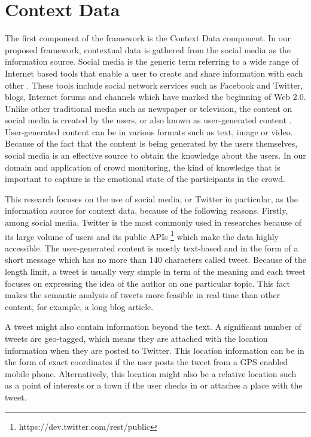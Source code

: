 \section{Context Data}
The first component of the framework is the Context Data component. In our proposed framework, contextual data is gathered from the social media as the information source. Social media is the generic term referring to a wide range of Internet based tools that enable a user to create and share information with each other \citep{kaplan2010users}. These tools include social network services such as Facebook and Twitter, blogs, Internet forums and channels which have marked the beginning of Web 2.0. Unlike other traditional media such as newspaper or television, the content on social media is created by the users, or also known as user-generated content \citep{kaplan2010users}. User-generated content can be in various formats such as text, image or video. Because of the fact that the content is being generated by the users themselves, social media is an effective source to obtain the knowledge about the users. In our domain and application of crowd monitoring, the kind of knowledge that is important to capture is the emotional state of the participants in the crowd. 

This research focuses on the use of social media, or Twitter in particular, as the information source for context data, because of the following reasons. Firstly, among social media, Twitter is the most commonly used in researches because of its large volume of users and its public APIs \footnote{https://dev.twitter.com/rest/public} which make the data highly accessible. The user-generated content is mostly text-based and in the form of a short message which has no more than 140 characters called tweet. Because of the length limit, a tweet is usually very simple in term of the meaning and each tweet focuses on expressing the idea of the author on one particular topic. This fact makes the semantic analysis of tweets more feasible in real-time than other content, for example, a long blog article.

A tweet might also contain information beyond the text. A significant number of tweets are geo-tagged, which means they are attached with the location information when they are posted to Twitter. This location information can be in the form of exact coordinates if the user posts the tweet from a GPS enabled mobile phone. Alternatively, this location might also be a relative location such as a point of interests or a town if the user checks in or attaches a place with the tweet.

